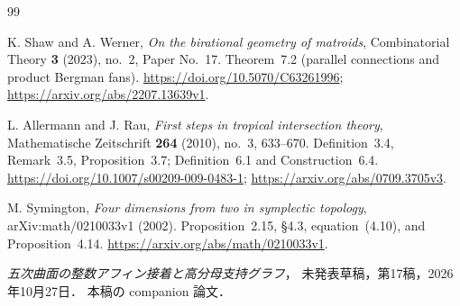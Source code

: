 \begin{thebibliography}{99}

K. Shaw and A. Werner,
\emph{On the birational geometry of matroids},
Combinatorial Theory \textbf{3} (2023), no.~2, Paper No.~17.
Theorem~7.2 (parallel connections and product Bergman fans).
\url{https://doi.org/10.5070/C63261996};
\url{https://arxiv.org/abs/2207.13639v1}.

L. Allermann and J. Rau,
\emph{First steps in tropical intersection theory},
Mathematische Zeitschrift \textbf{264} (2010), no.~3, 633--670.
Definition~3.4, Remark~3.5, Proposition~3.7;
Definition~6.1 and Construction~6.4.
\url{https://doi.org/10.1007/s00209-009-0483-1};
\url{https://arxiv.org/abs/0709.3705v3}.

M. Symington,
\emph{Four dimensions from two in symplectic topology},
arXiv:math/0210033v1 (2002).
Proposition~2.15, \S4.3, equation~(4.10), and Proposition~4.14.
\url{https://arxiv.org/abs/math/0210033v1}.

\emph{五次曲面の整数アフィン接着と高分母支持グラフ}，
未発表草稿，第17稿，2026年10月27日．
本稿の companion 論文．

\end{thebibliography}
